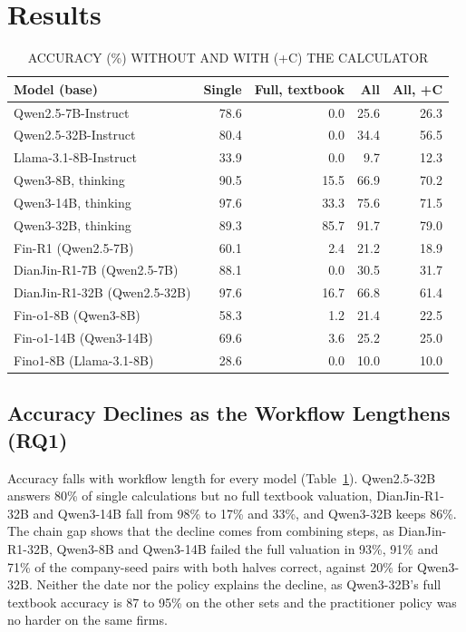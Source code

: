 \documentclass[conference]{IEEEtran}
\begin{document}
\section{Results}
\begin{table}[t]
\caption{ACCURACY (\%) WITHOUT AND WITH (+C) THE CALCULATOR}
\centering
\scriptsize
\renewcommand{\arraystretch}{0.82}
\begin{tabular}{|l|r|r|r|r|}
\hline
\textbf{Model (base)} & \textbf{Single} & \textbf{Full, textbook} & \textbf{All} & \textbf{All, +C} \\ \hline
Qwen2.5-7B-Instruct & 78.6 & 0.0 & 25.6 & 26.3 \\
Qwen2.5-32B-Instruct & 80.4 & 0.0 & 34.4 & 56.5 \\
Llama-3.1-8B-Instruct & 33.9 & 0.0 & 9.7 & 12.3 \\
Qwen3-8B, thinking & 90.5 & 15.5 & 66.9 & 70.2 \\
Qwen3-14B, thinking & 97.6 & 33.3 & 75.6 & 71.5 \\
Qwen3-32B, thinking & 89.3 & 85.7 & 91.7 & 79.0 \\ \hline
Fin-R1 (Qwen2.5-7B) & 60.1 & 2.4 & 21.2 & 18.9 \\
DianJin-R1-7B (Qwen2.5-7B) & 88.1 & 0.0 & 30.5 & 31.7 \\
DianJin-R1-32B (Qwen2.5-32B) & 97.6 & 16.7 & 66.8 & 61.4 \\
Fin-o1-8B (Qwen3-8B) & 58.3 & 1.2 & 21.4 & 22.5 \\
Fin-o1-14B (Qwen3-14B) & 69.6 & 3.6 & 25.2 & 25.0 \\
Fino1-8B (Llama-3.1-8B) & 28.6 & 0.0 & 10.0 & 10.0 \\ \hline
\end{tabular}
\label{tab3}
\end{table}

\subsection{Accuracy Declines as the Workflow Lengthens (RQ1)}
Accuracy falls with workflow length for every model (Table~\ref{tab3}). Qwen2.5-32B answers 80\% of single calculations but no full textbook valuation, DianJin-R1-32B and Qwen3-14B fall from 98\% to 17\% and 33\%, and Qwen3-32B keeps 86\%. The chain gap shows that the decline comes from combining steps, as DianJin-R1-32B, Qwen3-8B and Qwen3-14B failed the full valuation in 93\%, 91\% and 71\% of the company-seed pairs with both halves correct, against 20\% for Qwen3-32B. Neither the date nor the policy explains the decline, as Qwen3-32B's full textbook accuracy is 87 to 95\% on the other sets and the practitioner policy was no harder on the same firms.
\end{document}
